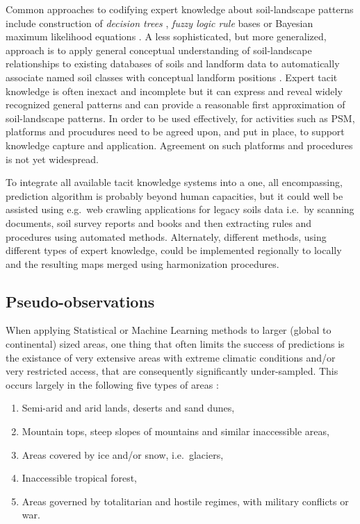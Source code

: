 \documentclass[11pt]{krantz}
\theoremstyle{definition}
\theoremstyle{definition}
\theoremstyle{definition}
\theoremstyle{remark}
\begin{document}
Common approaches to codifying expert knowledge about soil-landscape
patterns include construction of \emph{decision trees}
\citep{Walter2006DSS, Zhou2004JZUS}, \emph{fuzzy logic rule} bases
\citep{Zhu2001} or Bayesian maximum likelihood equations
\citep{Zhou2004JZUS}. A less sophisticated, but more generalized,
approach is to apply general conceptual understanding of soil-landscape
relationships to existing databases of soils and landform data to
automatically associate named soil classes with conceptual landform
positions \citep{MacMillan2005CJSS}. Expert tacit knowledge is often
inexact and incomplete but it can express and reveal widely recognized
general patterns and can provide a reasonable first approximation of
soil-landscape patterns. In order to be used effectively, for activities
such as PSM, platforms and procudures need to be agreed upon, and put in
place, to support knowledge capture and application. Agreement on such
platforms and procedures is not yet widespread.

To integrate all available tacit knowledge systems into a one, all
encompassing, prediction algorithm is probably beyond human capacities,
but it could well be assisted using e.g.~web crawling applications for
legacy soils data i.e.~by scanning documents, soil survey reports and
books and then extracting rules and procedures using automated methods.
Alternately, different methods, using different types of expert
knowledge, could be implemented regionally to locally and the resulting
maps merged using harmonization procedures.

\hypertarget{pseudo-observations}{%
\subsection{Pseudo-observations}\label{pseudo-observations}}

When applying Statistical or Machine Learning methods to larger (global
to continental) sized areas, one thing that often limits the success of
predictions is the existance of very extensive areas with extreme
climatic conditions and/or very restricted access, that are consequently
significantly under-sampled. This occurs largely in the following five
types of areas \citep{Hengl2017SoilGrids250m}:

\begin{enumerate}
\def\labelenumi{\arabic{enumi}.}
\item
  Semi-arid and arid lands, deserts and sand dunes,
\item
  Mountain tops, steep slopes of mountains and similar inaccessible
  areas,
\item
  Areas covered by ice and/or snow, i.e.~glaciers,
\item
  Inaccessible tropical forest,
\item
  Areas governed by totalitarian and hostile regimes, with military
  conflicts or war.
\end{enumerate}
\end{document}
